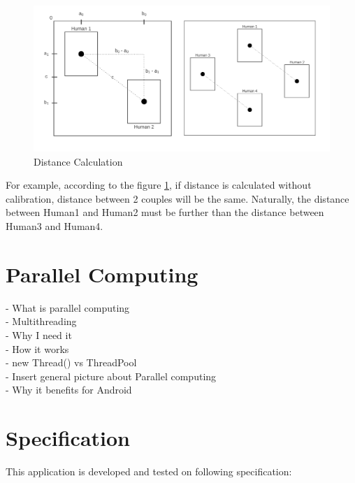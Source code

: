         \begin{figure}[!ht]
            \includegraphics[width=6in]{images/chapter2/distance-calculation.jpg}
            \caption{Distance Calculation}
            \label{distanceCalculation}
        \end{figure}

        For example, according to the figure \ref{distanceCalculation},
        if distance is calculated without calibration, distance between 2 couples will be the same.
        Naturally, the distance between Human1 and Human2 must be further than the distance between Human3 and Human4.

    \section{Parallel Computing}
        -	What is parallel computing \\
        -   Multithreading \\
        -	Why I need it \\
        -	How it works \\
            - new Thread() vs ThreadPool \\
            - Insert general picture about Parallel computing\\
        -	Why it benefits for Android\\


    \section{Specification}
        This application is developed and tested on following specification:

